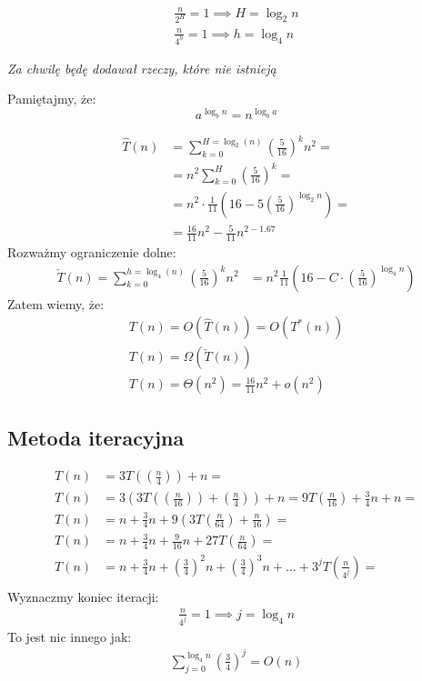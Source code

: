 \documentclass{article}
\numberwithin{equation}{subsection}
\begin{document}
\begin{align}
    \frac{n}{2^H} = 1 \implies H = \log_2 n\\
    \frac{n}{4^h} = 1 \implies h = \log_4 n
\end{align}

\vspace{1cm}

\noindent
\textit{Za chwilę będę dodawał rzeczy, które nie istnieją}

\vspace{1cm}

\noindent
Pamiętajmy, że:
\[
    a^{\log_b n} = n^{\log_b a}
\]

\begin{align}
    \hat{T}(n) &= \sum_{k=0}^{H=\log_2(n)} \left(\frac{5}{16}\right)^k n^2 =\\
    &= n^2 \sum_{k=0}^{H} \left(\frac{5}{16}\right)^k =\\
    &= n^2 \cdot \frac{1}{11} \left(16 - 5\left(\frac{5}{16}\right)^{\log_2 n}\right) =\\
    &= \frac{16}{11} n^2 - \frac{5}{11} n^{2-1.67}
\end{align}
Rozważmy ograniczenie dolne:
\begin{align}
    \check{T}(n) = \sum_{k=0}^{h=\log_4(n)} \left(\frac{5}{16}\right)^k n^2
    &= n^2 \frac{1}{11}\left(16 - C\cdot \left(\frac{5}{16}\right)^{\log_4 n}\right)
\end{align}
Zatem wiemy, że:
\begin{align}
    T(n) = O(\hat{T}(n)) = O(T^{*}(n))\\
    T(n) = \Omega(\check{T}(n))\\
    T(n) = \Theta(n^2) = \frac{16}{11} n^2 + o(n^2)
\end{align}

\subsection{Metoda iteracyjna}

\begin{align}
    T(n) &= 3T(\left(\frac{n}{4}\right)) + n =\\
    T(n) &= 3\left(3T\left(\left(\frac{n}{16}\right)\right) + \left(\frac{n}{4}\right)\right) + n = 9T\left(\frac{n}{16}\right) + \frac{3}{4} n + n =\\
    T(n) &= n + \frac{3}{4} n + 9\left(3T\left(\frac{n}{64}\right) + \frac{n}{16}\right) =\\
    T(n) &= n + \frac{3}{4} n + \frac{9}{16} n + 27T\left(\frac{n}{64}\right) =\\
    T(n) &= n + \frac{3}{4} n + \left(\frac{3}{4}\right)^2 n + \left(\frac{3}{4}\right)^3 n + \dots + 3^j T\left(\frac{n}{4^j}\right) =\\
\end{align}
Wyznaczmy koniec iteracji:
\begin{align}
    \frac{n}{4^j} = 1 \implies j = \log_4 n
\end{align}
To jest nic innego jak:
\begin{align}
    \sum_{j=0}^{\log_4 n} \left(\frac{3}{4}\right)^j = O(n)
\end{align}
\end{document}
